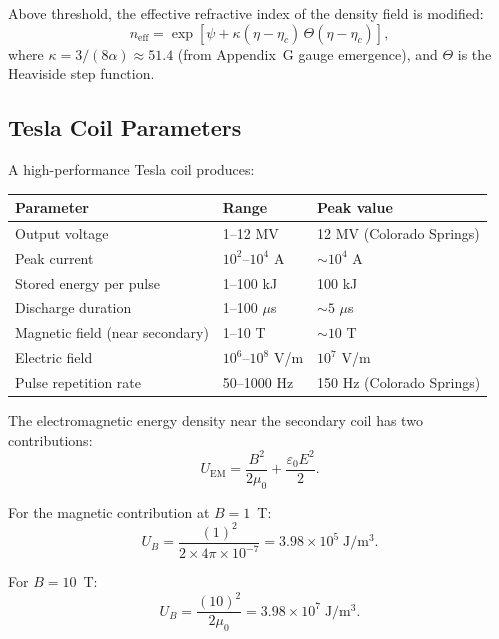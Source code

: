 \documentclass[11pt,a4paper]{article}
\begin{document}
Above threshold, the effective refractive index of the density field is modified:
\begin{equation}\label{eq:neff}
n_{\mathrm{eff}} = \exp\!\left[\psi + \kappa(\eta - \eta_c)\,\Theta(\eta - \eta_c)\right],
\end{equation}
where $\kappa = 3/(8\alpha) \approx 51.4$ (from Appendix~G gauge emergence),
and $\Theta$ is the Heaviside step function.

\subsection{Tesla Coil Parameters}

A high-performance Tesla coil produces:
\begin{center}
\begin{tabular}{lll}
\toprule
\textbf{Parameter} & \textbf{Range} & \textbf{Peak value} \\
\midrule
Output voltage & 1--12 MV & 12 MV (Colorado Springs) \\
Peak current & $10^2$--$10^4$ A & $\sim 10^4$ A \\
Stored energy per pulse & 1--100 kJ & 100 kJ \\
Discharge duration & 1--100 $\mu$s & $\sim 5$ $\mu$s \\
Magnetic field (near secondary) & 1--10 T & $\sim 10$ T \\
Electric field & $10^6$--$10^8$ V/m & $10^7$ V/m \\
Pulse repetition rate & 50--1000 Hz & 150 Hz (Colorado Springs) \\
\bottomrule
\end{tabular}
\end{center}

The electromagnetic energy density near the secondary coil has two contributions:
\begin{equation}\label{eq:UEM}
U_{\mathrm{EM}} = \frac{B^2}{2\mu_0} + \frac{\varepsilon_0 E^2}{2}.
\end{equation}

For the magnetic contribution at $B = 1$~T:
\begin{equation}
U_B = \frac{(1)^2}{2 \times 4\pi \times 10^{-7}} = 3.98 \times 10^5\;\mathrm{J/m^3}.
\end{equation}

For $B = 10$~T:
\begin{equation}
U_B = \frac{(10)^2}{2\mu_0} = 3.98 \times 10^7\;\mathrm{J/m^3}.
\end{equation}
\end{document}
